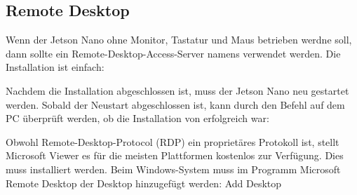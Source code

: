 \subsection{Remote Desktop}




Wenn der Jetson Nano ohne Monitor, Tastatur und Maus betrieben werdne soll, dann sollte ein
Remote-Desktop-Access-Server namens  verwendet werden. Die Installation ist einfach:

\medskip


\medskip

Nachdem die Installation abgeschlossen ist, muss der Jetson Nano neu gestartet werden. 
Sobald der Neustart abgeschlossen ist, kann durch den Befehl   auf dem PC überprüft werden, ob die Installation von 
 erfolgreich war:

\medskip











\SHELL{\$}

\medskip




Obwohl Remote-Desktop-Protocol (RDP) ein proprietäres Protokoll ist, stellt Microsoft Viewer es für die meisten Plattformen kostenlos zur Verfügung. Dies muss installiert werden. Beim Windows-System muss im Programm Microsoft Remote Desktop
der Desktop hinzugefügt werden: \glqq Add Desktop\grqq

\medskip




